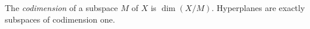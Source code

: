 The \emph{codimension} of a subspace $M$ of $X$ is $\dim(X/M)$. Hyperplanes are exactly subspaces of codimension one.
